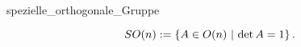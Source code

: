 \documentclass[class=article, crop=false]{standalone}
\begin{document}
\begin{zettel}{spezielle_orthogonale_Gruppe}
\begin{flashcard}
\[
SO (n):= \set{A \in  O (n)}{\det A =1}
.\]
\end{flashcard}
\end{zettel}
\end{document}
